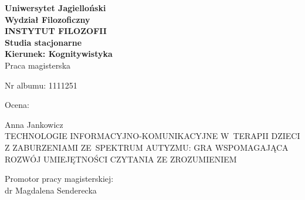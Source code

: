 \documentclass[a4paper,12pt]{report}
\title{\titlepl}
\author{\authorname}
\date{2019}
\newcommand{\authorname}{Anna Jankowicz}
\newcommand{\supname}{dr Magdalena Senderecka}
\begin{document}

\thispagestyle{empty}

{\centering\linespread{1.05}
    \textbf{
    {\Large Uniwersytet Jagielloński\\}
    {\large Wydział Filozoficzny\\
      \uppercase{Instytut Filozofii}\\}
      \textbf{Studia stacjonarne\\
      Kierunek: Kognitywistyka}\\
    }
    \vspace{0.5cm}    
    {\large{Praca magisterska\\}}
}

\vspace{1cm}
\begin{minipage}[t]{0.4\textwidth}
    \begin{flushleft} \large Nr albumu: 1111251\\ \end{flushleft}
\end{minipage}
\begin{minipage}[t]{0.4\textwidth}
    \begin{flushright} \large Ocena:\\ \end{flushright}
\end{minipage}

\vspace{0.3cm}
{\centering\LARGE{\authorname\\}}
\vspace{0.5cm}
{\centering\linespread{1.15}\LARGE{TECHNOLOGIE INFORMACYJNO-KOMUNIKACYJNE W~TERAPII DZIECI Z ZABURZENIAMI ZE~SPEKTRUM AUTYZMU: GRA WSPOMAGAJĄCA ROZWÓJ UMIEJĘTNOŚCI CZYTANIA ZE ZROZUMIENIEM\\}}

\vspace{2.5cm}
\begin{minipage}[t]{0.4\textwidth}
    \begin{flushleft} \large
    \end{flushleft}
\end{minipage}
\begin{minipage}[t]{0.5\textwidth}
    \begin{flushright} \large
    Promotor pracy magisterskiej:\\ \supname
    \end{flushright}
\end{minipage}
\vspace{2cm}
\end{document}
